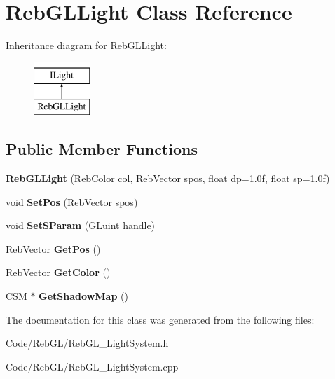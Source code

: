 \hypertarget{class_reb_g_l_light}{}\section{Reb\+G\+L\+Light Class Reference}
\label{class_reb_g_l_light}
Inheritance diagram for Reb\+G\+L\+Light\+:\begin{figure}[H]
\begin{center}
\leavevmode
\includegraphics[height=2.000000cm]{class_reb_g_l_light}
\end{center}
\end{figure}
\subsection*{Public Member Functions}
\begin{DoxyCompactItemize}
\item 
{\bfseries Reb\+G\+L\+Light} (Reb\+Color col, Reb\+Vector spos, float dp=1.\+0f, float sp=1.\+0f)\hypertarget{class_reb_g_l_light_ad6ea506a4095b0c7f1b72263afc25e62}{}\label{class_reb_g_l_light_ad6ea506a4095b0c7f1b72263afc25e62}

\item 
void {\bfseries Set\+Pos} (Reb\+Vector spos)\hypertarget{class_reb_g_l_light_aabc84c5bb77247ff1339b47f6b9b291b}{}\label{class_reb_g_l_light_aabc84c5bb77247ff1339b47f6b9b291b}

\item 
void {\bfseries Set\+S\+Param} (G\+Luint handle)\hypertarget{class_reb_g_l_light_a2f8e52c9ca4aecc85e2967a08b783d64}{}\label{class_reb_g_l_light_a2f8e52c9ca4aecc85e2967a08b783d64}

\item 
Reb\+Vector {\bfseries Get\+Pos} ()\hypertarget{class_reb_g_l_light_a2f490b933e753fd226cb5b9eb050cc8e}{}\label{class_reb_g_l_light_a2f490b933e753fd226cb5b9eb050cc8e}

\item 
Reb\+Vector {\bfseries Get\+Color} ()\hypertarget{class_reb_g_l_light_a2366f633de4e7db4447d1f4a37af24bb}{}\label{class_reb_g_l_light_a2366f633de4e7db4447d1f4a37af24bb}

\item 
\hyperlink{class_c_s_m}{C\+SM} $\ast$ {\bfseries Get\+Shadow\+Map} ()\hypertarget{class_reb_g_l_light_aa4bfadd980ab06f598c17256b6f86ccb}{}\label{class_reb_g_l_light_aa4bfadd980ab06f598c17256b6f86ccb}

\end{DoxyCompactItemize}


The documentation for this class was generated from the following files\+:\begin{DoxyCompactItemize}
\item 
Code/\+Reb\+G\+L/Reb\+G\+L\+\_\+\+Light\+System.\+h\item 
Code/\+Reb\+G\+L/Reb\+G\+L\+\_\+\+Light\+System.\+cpp\end{DoxyCompactItemize}
